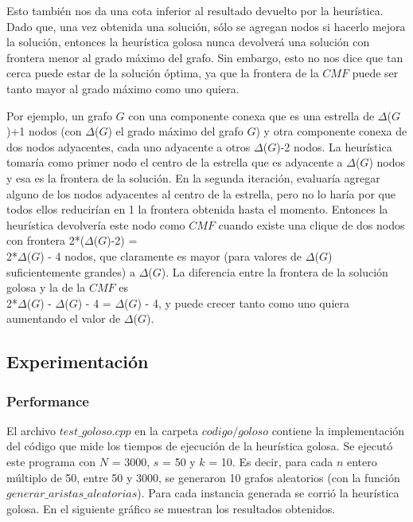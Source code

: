 \par{Esto también nos da una cota inferior al resultado devuelto por la
heurística. Dado que, una vez obtenida una solución, sólo se agregan nodos
si hacerlo mejora la solución, entonces la heurística golosa nunca devolverá
una solución con frontera menor al grado máximo del grafo. Sin embargo, esto
no nos dice que tan cerca puede estar de la solución óptima, ya que la frontera
de la $CMF$ puede ser tanto mayor al grado máximo como uno quiera.}\\

\par{Por ejemplo, un grafo $G$ con una componente conexa que es una estrella
de $\Delta$($G$)+1 nodos (con $\Delta$($G$) el grado máximo del grafo $G$) y
otra componente conexa de dos nodos adyacentes, cada uno adyacente a
otros $\Delta$($G$)-2 nodos. La heurística tomaría como primer nodo el centro
de la estrella que es adyacente a $\Delta$($G$) nodos y esa es la frontera de
la solución. En la segunda iteración, evaluaría agregar alguno de los nodos
adyacentes al centro de la estrella, pero no lo haría por que todos ellos
reducirían en 1 la frontera obtenida hasta el momento. Entonces la heurística
devolvería este nodo como $CMF$ cuando existe una clique de dos nodos con
frontera 2*($\Delta$($G$)-2) =\\2*$\Delta$($G$) - 4 nodos, que claramente es
mayor (para valores de $\Delta$($G$) suficientemente grandes) a $\Delta$($G$).
La diferencia entre la frontera de la solución golosa y la de la $CMF$ es\\
2*$\Delta$($G$) - $\Delta$($G$) - 4 = $\Delta$($G$) - 4, y puede crecer
tanto como uno quiera aumentando el valor de $\Delta$($G$).}

\subsection{Experimentación}

\subsubsection{Performance}

\par{El archivo $test\_goloso.cpp$ en la carpeta $codigo/goloso$ contiene la
implementación del código que mide los tiempos de ejecución de la heurística
golosa. Se ejecutó este programa con $N$ = 3000, $s$ = 50 y $k$ = 10. Es decir,
para cada $n$ entero múltiplo de 50, entre 50 y 3000, se generaron 10 grafos
aleatorios (con la función $generar\_aristas\_aleatorias$). Para cada instancia
generada se corrió la heurística golosa.
En el siguiente gráfico se muestran los resultados obtenidos.}

